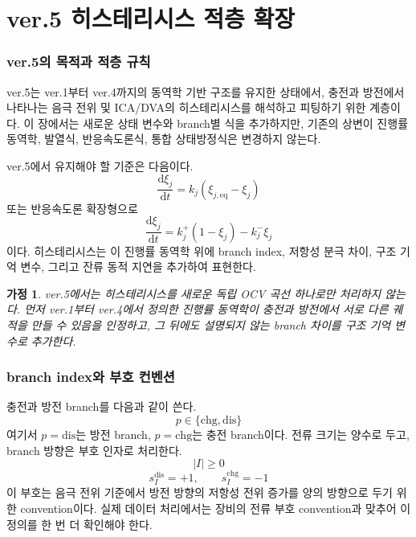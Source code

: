 \documentclass[11pt,a4paper]{article}
\newtheorem*{assumption}{가정}
\newcommand{\dd}{\mathrm{d}}
\newcommand{\eq}{\mathrm{eq}}
\newcommand{\dis}{\mathrm{dis}}
\newcommand{\chg}{\mathrm{chg}}
\begin{document}
\part*{ver.5 히스테리시스 적층 확장}

\section{ver.5의 목적과 적층 규칙}
ver.5는 ver.1부터 ver.4까지의 동역학 기반 구조를 유지한 상태에서, 충전과 방전에서 나타나는 음극 전위 및 ICA/DVA의 히스테리시스를 해석하고 피팅하기 위한 계층이다. 이 장에서는 새로운 상태 변수와 branch별 식을 추가하지만, 기존의 상변이 진행률 동역학, 발열식, 반응속도론식, 통합 상태방정식은 변경하지 않는다.

ver.5에서 유지해야 할 기준은 다음이다.
\begin{equation}
\frac{\dd\xi_j}{\dd t}=k_j(\xi_{j,\eq}-\xi_j)
\end{equation}
또는 반응속도론 확장형으로
\begin{equation}
\frac{\dd\xi_j}{\dd t}=k_j^+(1-\xi_j)-k_j^-\xi_j
\end{equation}
이다. 히스테리시스는 이 진행률 동역학 위에 branch index, 저항성 분극 차이, 구조 기억 변수, 그리고 잔류 동적 지연을 추가하여 표현한다.

\begin{assumption}
ver.5에서는 히스테리시스를 새로운 독립 OCV 곡선 하나로만 처리하지 않는다. 먼저 ver.1부터 ver.4에서 정의한 진행률 동역학이 충전과 방전에서 서로 다른 궤적을 만들 수 있음을 인정하고, 그 뒤에도 설명되지 않는 branch 차이를 구조 기억 변수로 추가한다.
\end{assumption}

\section{branch index와 부호 컨벤션}
충전과 방전 branch를 다음과 같이 쓴다.
\begin{equation}
p\in\{\chg,\dis\}
\end{equation}
여기서 \(p=\dis\)는 방전 branch, \(p=\chg\)는 충전 branch이다. 전류 크기는 양수로 두고, branch 방향은 부호 인자로 처리한다.
\begin{equation}
|I|\geq0
\end{equation}
\begin{equation}
s_I^{\dis}=+1,\qquad s_I^{\chg}=-1
\end{equation}
이 부호는 음극 전위 기준에서 방전 방향의 저항성 전위 증가를 양의 방향으로 두기 위한 convention이다. 실제 데이터 처리에서는 장비의 전류 부호 convention과 맞추어 이 정의를 한 번 더 확인해야 한다.
\end{document}
